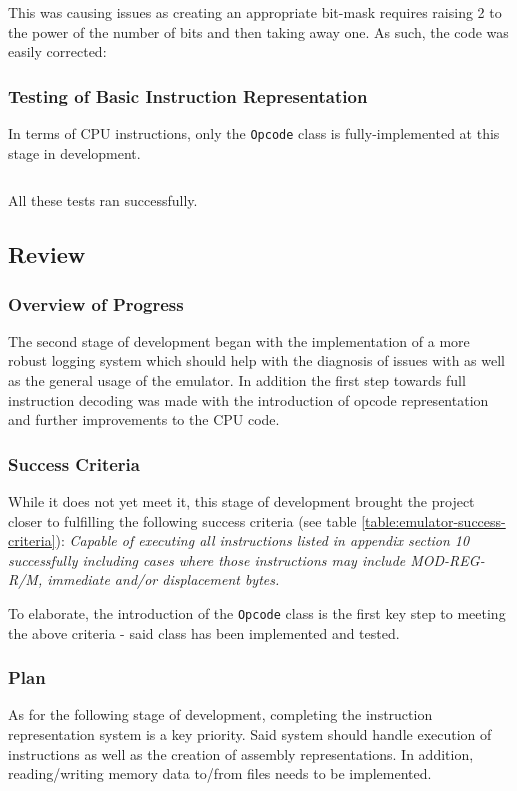        This was causing issues as creating an appropriate bit-mask requires raising 2 to the power of the number of bits and then taking away one. As such, the code was easily corrected: 


    \subsubsection{Testing of Basic Instruction Representation}
        In terms of CPU instructions, only the \texttt{Opcode} class is fully-implemented at this stage in development.

        \inputminted{c++}{code/second/testinstructions.cpp}

        All these tests ran successfully.

\subsection{Review}
    \subsubsection{Overview of Progress}
        The second stage of development began with the implementation of a more robust logging system which should help with the diagnosis of issues with as well as the general usage of the emulator. In addition the first step towards full instruction decoding was made with the introduction of opcode representation and further improvements to the CPU code.

    \subsubsection{Success Criteria}
        While it does not yet meet it, this stage of development brought the project closer to fulfilling the following success criteria (see table \ref{table:emulator-success-criteria}): \textit{Capable of executing all instructions listed in appendix section 10 successfully including cases where those instructions may include MOD-REG-R/M, immediate and/or displacement bytes.}

        To elaborate, the introduction of the \texttt{Opcode} class is the first key step to meeting the above criteria - said class has been implemented and tested.

    \subsubsection{Plan}
        As for the following stage of development, completing the instruction representation system is a key priority. Said system should handle execution of instructions as well as the creation of assembly representations. In addition, reading/writing memory data to/from files needs to be implemented.



